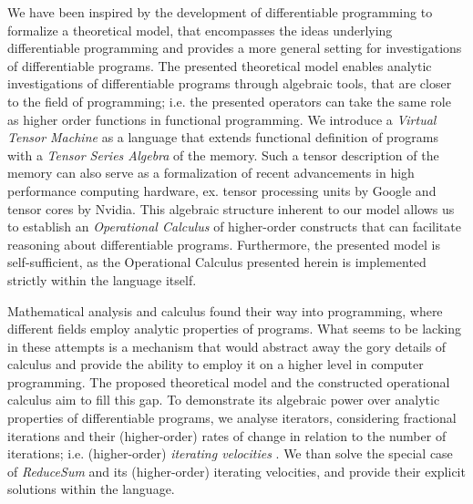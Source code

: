 We have been inspired by the development of differentiable programming to formalize a theoretical model, that encompasses the ideas underlying differentiable programming and provides a more general setting for investigations of differentiable programs. The presented theoretical model enables analytic investigations of differentiable programs through algebraic tools, that are closer to the field of programming; i.e. the presented operators can take the same role as higher order functions in functional programming. We introduce a \emph{Virtual Tensor Machine} as a language that extends functional definition of programs with a \emph{Tensor Series Algebra} of the memory. Such a tensor description of the memory can also serve as a formalization of recent advancements in high performance computing hardware, ex. tensor processing units by Google and tensor cores by Nvidia. This algebraic structure inherent to our model allows us to establish an \emph{Operational Calculus} of higher-order constructs that can facilitate reasoning about differentiable programs. Furthermore, the presented model is self-sufficient, as the Operational Calculus presented herein is implemented strictly within the language itself.

Mathematical analysis and calculus found their way into programming, where different fields employ analytic properties of programs. What seems to be lacking in these attempts is a mechanism that would abstract away the gory details of calculus and provide the ability to employ it on a higher level in computer programming. The proposed theoretical model and the constructed operational calculus aim to fill this gap. To demonstrate its algebraic power over analytic properties of differentiable programs, we analyse iterators, considering fractional iterations and their (higher-order) rates of change in relation to the number of iterations; i.e. (higher-order) \emph{ iterating velocities }. We than solve the special case of \emph{ReduceSum} and its (higher-order) iterating velocities, and provide their explicit solutions within the language.

